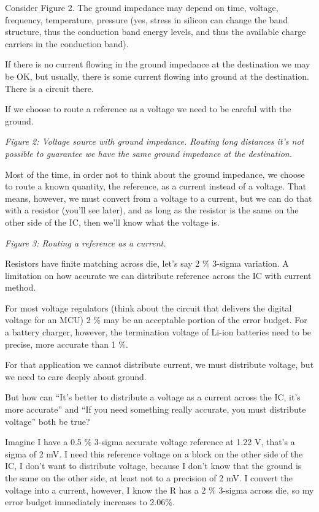 Consider Figure 2. The ground impedance may depend on time, voltage,
frequency, temperature, pressure (yes, stress in silicon can change the
band structure, thus the conduction band energy levels, and thus the
available charge carriers in the conduction band).

If there is no current flowing in the ground impedance at the
destination we may be OK, but usually, there is some current flowing
into ground at the destination. There is a circuit there.

If we choose to route a reference as a voltage we need to be careful
with the ground.


{
\centering
{}
}

\emph{Figure 2: Voltage source with ground impedance. Routing long
distances it's not possible to guarantee we have the same ground
impedance at the destination.}

Most of the time, in order not to think about the ground impedance, we
choose to route a known quantity, the reference, as a current instead of
a voltage. That means, however, we must convert from a voltage to a
current, but we can do that with a resistor (you'll see later), and as
long as the resistor is the same on the other side of the IC, then we'll
know what the voltage is.


{
\centering
{}
}

\emph{Figure 3: Routing a reference as a current. }

Resistors have finite matching across die, let's say 2 \% 3-sigma
variation. A limitation on how accurate we can distribute reference
across the IC with current method.

For most voltage regulators (think about the circuit that delivers the
digital voltage for an MCU) 2 \% may be an acceptable portion of the
error budget. For a battery charger, however, the termination voltage of
Li-ion batteries need to be precise, more accurate than 1 \%.

For that application we cannot distribute current, we must distribute
voltage, but we need to care deeply about ground.

But how can ``It's better to distribute a voltage as a current across
the IC, it's more accurate'' and ``If you need something really
accurate, you must distribute voltage'' both be true?

Imagine I have a 0.5 \% 3-sigma accurate voltage reference at 1.22 V,
that's a sigma of 2 mV. I need this reference voltage on a block on the
other side of the IC, I don't want to distribute voltage, because I
don't know that the ground is the same on the other side, at least not
to a precision of 2 mV. I convert the voltage into a current, however, I
know the R has a 2 \% 3-sigma across die, so my error budget immediately
increases to 2.06\%.

